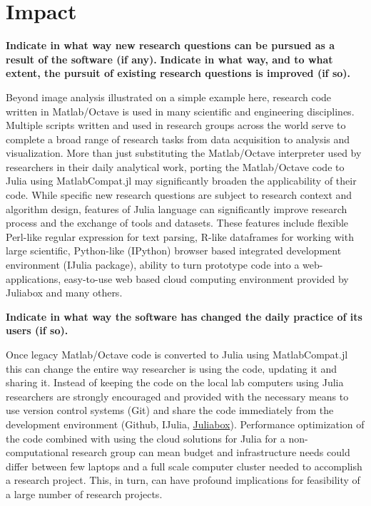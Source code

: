 \section{Impact}
\label{Impact} 

\textbf{Indicate in what way new research questions can be pursued as a result of the software (if any).}
\textbf{Indicate in what way, and to what extent, the pursuit of existing research questions is improved (if so).}

Beyond image analysis illustrated on a simple example here, research code written in Matlab/Octave is used in many scientific and engineering disciplines. Multiple scripts written and used in research groups across the world serve to complete a broad range of research tasks from data acquisition to analysis and visualization. More than just substituting the Matlab/Octave interpreter used by researchers in their daily analytical work, porting the Matlab/Octave code to Julia using MatlabCompat.jl may significantly broaden the applicability of their code. While specific new research questions are subject to research context and algorithm design, features of Julia language can significantly improve research process and the exchange of tools and datasets. These features include flexible Perl-like regular expression for text parsing, R-like dataframes for working with large scientific, Python-like (IPython) browser based integrated development environment (IJulia package), ability to turn prototype code into a web-applications, easy-to-use web based cloud computing environment provided by Juliabox and many others.

\textbf{Indicate in what way the software has changed the daily practice of its users (if so).}

Once legacy Matlab/Octave code is converted to Julia using MatlabCompat.jl this can change the entire way researcher is using the code, updating it and sharing it. Instead of keeping the code on the local lab computers using Julia researchers are strongly encouraged and provided with the necessary means to use version control systems (Git) and share the code immediately from the development environment (Github, IJulia, \href{https://www.juliabox.org/}{Juliabox}). Performance optimization of the code combined with using the cloud solutions for Julia for a non-computational research group can mean budget and infrastructure needs could differ between few laptops and a full scale computer cluster needed to accomplish a research project. This, in turn, can have profound implications for feasibility of a large number of research projects.

